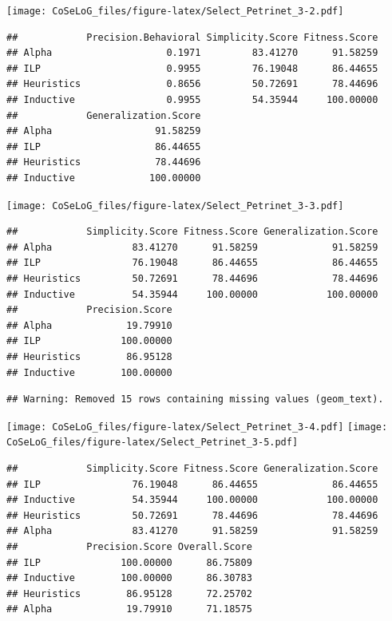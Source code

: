 \documentclass[]{article}
\begin{document}
\texttt{[image: CoSeLoG\_files/figure-latex/Select\_Petrinet\_3-2.pdf]}

\begin{verbatim}
##            Precision.Behavioral Simplicity.Score Fitness.Score
## Alpha                    0.1971         83.41270      91.58259
## ILP                      0.9955         76.19048      86.44655
## Heuristics               0.8656         50.72691      78.44696
## Inductive                0.9955         54.35944     100.00000
##            Generalization.Score
## Alpha                  91.58259
## ILP                    86.44655
## Heuristics             78.44696
## Inductive             100.00000
\end{verbatim}

\texttt{[image: CoSeLoG\_files/figure-latex/Select\_Petrinet\_3-3.pdf]}

\begin{verbatim}
##            Simplicity.Score Fitness.Score Generalization.Score
## Alpha              83.41270      91.58259             91.58259
## ILP                76.19048      86.44655             86.44655
## Heuristics         50.72691      78.44696             78.44696
## Inductive          54.35944     100.00000            100.00000
##            Precision.Score
## Alpha             19.79910
## ILP              100.00000
## Heuristics        86.95128
## Inductive        100.00000
\end{verbatim}

\begin{verbatim}
## Warning: Removed 15 rows containing missing values (geom_text).
\end{verbatim}

\texttt{[image: CoSeLoG\_files/figure-latex/Select\_Petrinet\_3-4.pdf]}
\texttt{[image: CoSeLoG\_files/figure-latex/Select\_Petrinet\_3-5.pdf]}

\begin{verbatim}
##            Simplicity.Score Fitness.Score Generalization.Score
## ILP                76.19048      86.44655             86.44655
## Inductive          54.35944     100.00000            100.00000
## Heuristics         50.72691      78.44696             78.44696
## Alpha              83.41270      91.58259             91.58259
##            Precision.Score Overall.Score
## ILP              100.00000      86.75809
## Inductive        100.00000      86.30783
## Heuristics        86.95128      72.25702
## Alpha             19.79910      71.18575
\end{verbatim}
\end{document}
